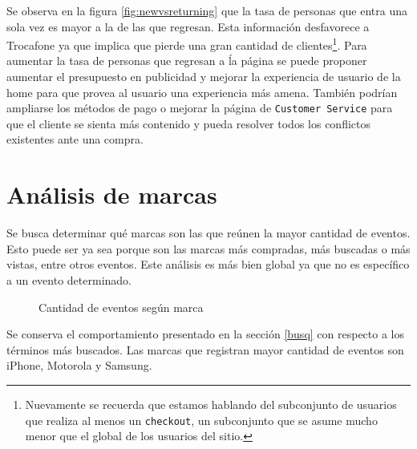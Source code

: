 \documentclass[a4paper]{article}
\begin{document}
Se observa en la figura \ref{fig:newvsreturning} que la tasa de personas que entra una sola vez es mayor a la de las que regresan. Esta información desfavorece a Trocafone ya que implica que pierde una gran cantidad de clientes\footnote{Nuevamente se recuerda que estamos hablando del subconjunto de usuarios que realiza al menos un \texttt{checkout}, un subconjunto que se asume mucho menor que el global de los usuarios del sitio.}. Para aumentar la tasa de personas que regresan a ĺa página se puede proponer aumentar el presupuesto en publicidad y mejorar la experiencia de usuario de la home para que provea al usuario una experiencia más amena. También podrían ampliarse los métodos de pago o mejorar la página de \texttt{Customer Service} para que el cliente se sienta más contenido y pueda resolver todos los conflictos existentes ante una compra.

\section{Análisis de marcas}

Se busca determinar qué marcas son las que reúnen la mayor cantidad de eventos. Esto puede ser ya sea porque son las marcas más compradas, más buscadas o más vistas, entre otros eventos. Este análisis es más bien global ya que no es específico a un evento determinado.

\begin{figure}[h!]
	\caption{Cantidad de eventos según marca}
	\label{fig:freqbrands}
\end{figure}

Se conserva el comportamiento presentado en la sección \ref{busq} con respecto a los términos más buscados. Las marcas que registran mayor cantidad de eventos son iPhone, Motorola y Samsung.
\end{document}
